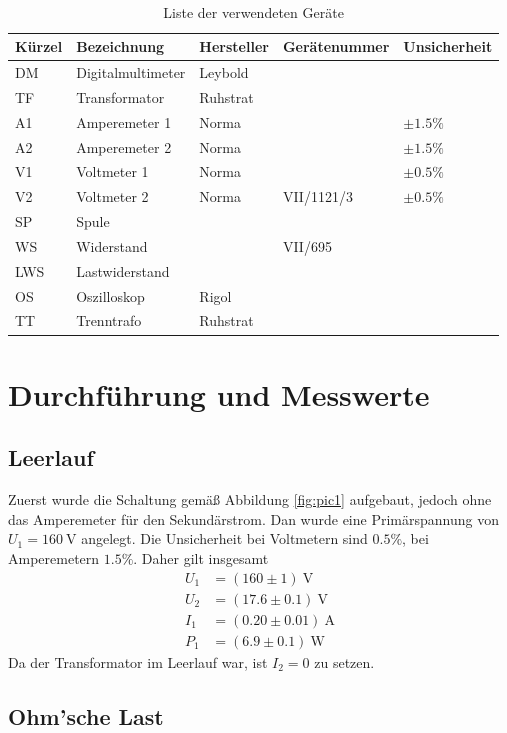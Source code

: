 \documentclass{article}
\newcommand{\W}{\text{W}}
\newcommand{\V}{\text{V}}
\newcommand{\A}{\text{A}}
\begin{document}
\begin{table}[H]
\caption{Liste der verwendeten Geräte}

~

\begin{tabular}{l|llll}
Kürzel & Bezeichnung & Hersteller & Gerätenummer & Unsicherheit \\
\hline
DM & Digitalmultimeter & Leybold \\
TF & Transformator & Ruhstrat \\
A1 & Amperemeter 1 & Norma & & $\pm 1.5\%$ \\
A2 & Amperemeter 2 & Norma & & $\pm 1.5\%$ \\
V1 & Voltmeter 1 & Norma & & $\pm 0.5\%$ \\
V2 & Voltmeter 2 & Norma & VII/1121/3 & $\pm 0.5\%$ \\
SP & Spule \\
WS & Widerstand  & & VII/695 \\
LWS & Lastwiderstand \\
OS & Oszilloskop & Rigol \\
TT & Trenntrafo & Ruhstrat 
\end{tabular}

\end{table}




\section{Durchführung und Messwerte}

\subsection{Leerlauf}

Zuerst wurde die Schaltung gemäß Abbildung \ref{fig:pic1} aufgebaut, jedoch ohne das Amperemeter für den Sekundärstrom. Dan wurde eine Primärspannung von $U_1= 160~$V angelegt. Die Unsicherheit bei Voltmetern sind $0.5\%$, bei Amperemetern $1.5\%$. Daher gilt insgesamt 
\begin{align*}
U_1 &= (160 \pm 1)~\V \\
U_2 &= (17.6 \pm 0.1)~\V \\
I_1 &= (0.20 \pm 0.01)~\A \\
P_1 &= (6.9 \pm 0.1)~\W
\end{align*}
Da der Transformator im Leerlauf war, ist $I_2 = 0$ zu setzen.


\subsection{Ohm'sche Last}
\end{document}
